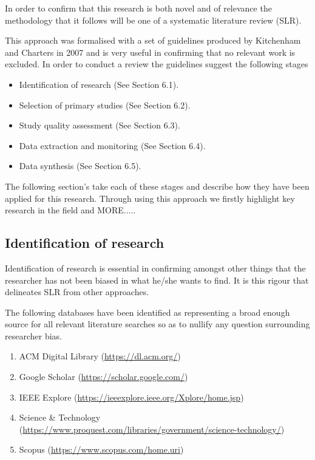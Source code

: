 \noindent
In order to confirm that this research is both novel and of relevance the methodology that it follows will be one of a systematic literature review (SLR).
\par
This approach was formalised with a set of guidelines produced by Kitchenham and Charters in 2007 and is very useful in confirming that no relevant work is excluded. In order to conduct a review the guidelines suggest the following stages

\begin{itemize}
 \item Identification of research (See Section 6.1). 
 \item Selection of primary studies (See Section 6.2). 
 \item Study quality assessment (See Section 6.3). 
 \item Data extraction and monitoring (See Section 6.4). 
 \item Data synthesis (See Section 6.5). 
\end{itemize}

\noindent
The following section's take each of these stages and describe how they have been applied for this research. Through using this approach we firstly highlight key research in the field and MORE.....  
 

\subsection{Identification of research}
Identification of research is essential in confirming amongst other things that the researcher has not been biased in what he/she wants to find. It is this rigour that delineates SLR from other approaches. 
\par
The following databases have been identified as representing a broad enough source for all relevant literature searches so as to nullify any question surrounding researcher bias.    

\begin{enumerate}
  \item ACM Digital Library (\href{https://dl.acm.org/}{https://dl.acm.org/})
   \item Google Scholar (\href{https://scholar.google.com/}{https://scholar.google.com/})
   \item IEEE Explore (\href{https://ieeexplore.ieee.org/Xplore/home.jsp}{https://ieeexplore.ieee.org/Xplore/home.jsp})
   \item Science \& Technology\\ (\href{https://www.proquest.com/libraries/government/science-technology/}{https://www.proquest.com/libraries/government/science-technology/})
   \item Scopus (\href{https://www.scopus.com/home.uri}{https://www.scopus.com/home.uri})
\end{enumerate}

